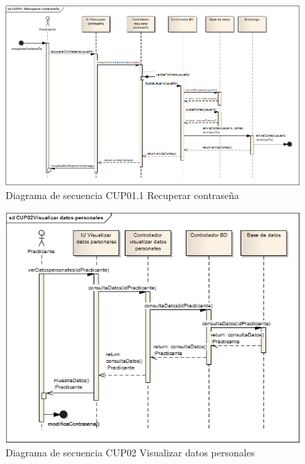 \begin{figure}[H]
	\begin{center}
		\includegraphics[scale=0.5]{./Figuras/Secuencias/CUP01_1Recuperar_contrasena}
	\end{center}
	\caption{Diagrama de secuencia CUP01.1 Recuperar contraseña}
	\label{fig:SE_CUP011}
\end{figure}

\begin{figure}[H]
	\begin{center}
		\includegraphics[scale=0.7]{./Figuras/Secuencias/CUP02Visualizar_datos_personales}
	\end{center}
	\caption{Diagrama de secuencia CUP02 Visualizar datos personales}
	\label{fig:SE_CUP02}
\end{figure}


